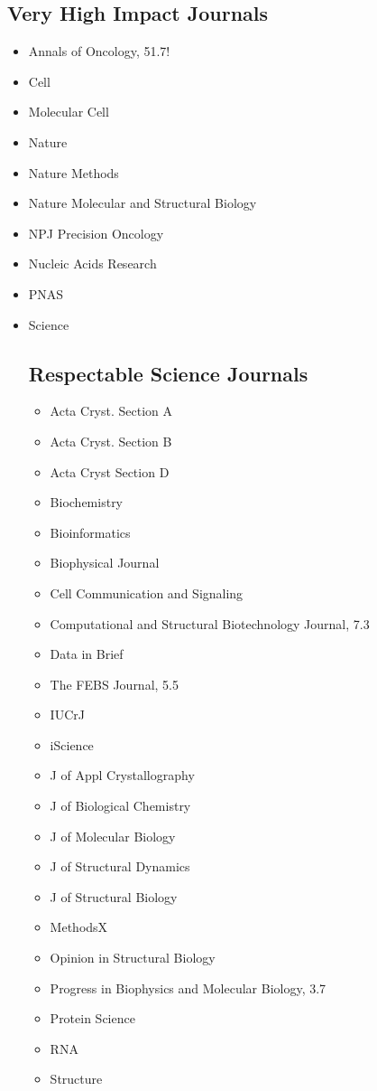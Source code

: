 \documentclass[10pt,letterpaper]{article}
\begin{document}
\subsection{Very High Impact Journals}

\begin{itemize}
  \item Annals of Oncology, 51.7!
  \item Cell
  \item Molecular Cell
  \item Nature
  \item Nature Methods
  \item Nature Molecular and Structural Biology
  \item NPJ Precision Oncology
  \item Nucleic Acids Research
  \item PNAS
  \item Science
\begin{itemize}


\subsection{Respectable Science Journals}


\begin{itemize}
  \item Acta Cryst. Section A
  \item Acta Cryst. Section B
  \item Acta Cryst Section D
  \item Biochemistry
  \item Bioinformatics
  \item Biophysical Journal
  \item Cell Communication and Signaling
  \item Computational and Structural Biotechnology Journal, 7.3
  \item Data in Brief
  \item The FEBS Journal, 5.5
  \item IUCrJ
  \item iScience
  \item J of Appl Crystallography
  \item J of Biological Chemistry
  \item J of Molecular Biology
  \item J of Structural Dynamics
  \item J of Structural Biology
  \item MethodsX
  \item Opinion in Structural Biology
  \item Progress in Biophysics and Molecular Biology, 3.7
  \item Protein Science
  \item RNA
  \item Structure
\end{itemize}



\end{itemize}
\end{itemize}
\end{document}
